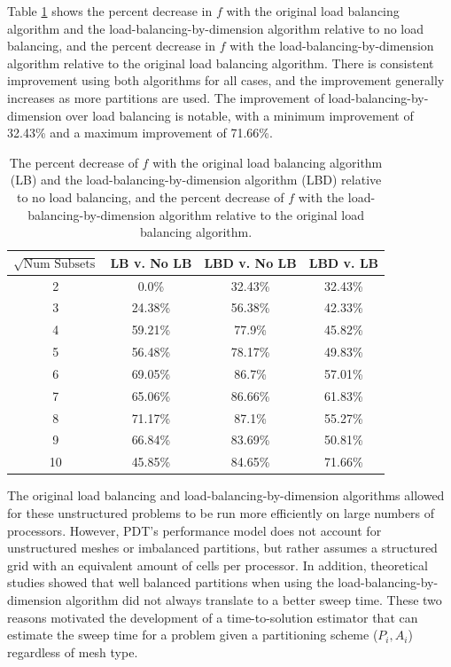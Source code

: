 \documentclass[times,final]{elsarticle}
\begin{document}
Table \ref{metric_improvement} shows the percent decrease in $f$ with the original load balancing algorithm and the load-balancing-by-dimension algorithm relative to no load balancing, and the percent decrease in $f$ with the load-balancing-by-dimension algorithm relative to the original load balancing algorithm.
There is consistent improvement using both algorithms for all cases, and the improvement generally increases as more partitions are used.
The improvement of load-balancing-by-dimension over load balancing is notable, with a minimum improvement of 32.43\% and a maximum improvement of 71.66\%.
\begin{table}[H]
\centering
\caption{The percent decrease of $f$ with the original load balancing algorithm (LB) and the load-balancing-by-dimension algorithm (LBD) relative to no load balancing, and the percent decrease of $f$ with the load-balancing-by-dimension algorithm relative to the original load balancing algorithm.}
\label{metric_improvement}
\begin{tabular}{c|c|c|c}
\centering
\textbf{$\sqrt{\text{Num Subsets}}$} & \textbf{LB v. No LB}  & \textbf{LBD v. No LB} & \textbf{LBD v. LB} \\ \hline
2&0.0\%&32.43\%&32.43\%\\ \hline
3&24.38\%&56.38\%&42.33\%\\ \hline
4&59.21\%&77.9\%&45.82\%\\ \hline
5&56.48\%&78.17\%&49.83\%\\ \hline
6&69.05\%&86.7\%&57.01\%\\ \hline
7&65.06\%&86.66\%&61.83\%\\ \hline
8&71.17\%&87.1\%&55.27\%\\ \hline
9&66.84\%&83.69\%&50.81\%\\ \hline
10&45.85\%&84.65\%&71.66\%
\end{tabular}
\end{table}

\FloatBarrier
The original load balancing and load-balancing-by-dimension algorithms allowed for these unstructured problems to be run more efficiently on large numbers of processors.
However, PDT's performance model does not account for unstructured meshes or imbalanced partitions, but rather assumes a structured grid with an equivalent amount of cells per processor.
In addition, theoretical studies showed that well balanced partitions when using the load-balancing-by-dimension algorithm did not always translate to a better sweep time.
These two reasons motivated the development of a time-to-solution estimator that can estimate the sweep time for a problem given a partitioning scheme ($P_i, A_i$) regardless of mesh type. 
\end{document}
